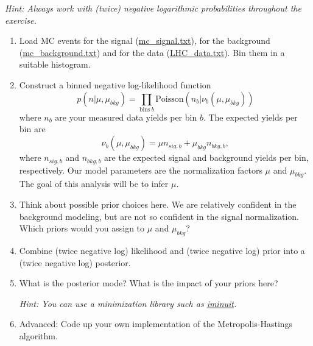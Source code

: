 \documentclass{article}
\begin{document}
\textit{Hint: Always work with (twice) negative logarithmic probabilities throughout the exercise.}
\begin{enumerate}
    \item Load MC events for the signal (\href{https://github.com/lorenzennio/icsc-bayesian-inference/blob/main/mc_signal.txt}{mc\_signal.txt}), for the background (\href{https://github.com/lorenzennio/icsc-bayesian-inference/blob/main/mc_background.txt}{mc\_background.txt}) and for the data (\href{https://github.com/lorenzennio/icsc-bayesian-inference/blob/main/LHC_data.txt}{LHC\_data.txt}). Bin them in a suitable histogram.

    \item Construct a binned negative log-likelihood function
    $$p(n|\mu, \mu_{bkg}) = \prod_{\mathrm{bins}~b} \mathrm{Poisson}(n_b|\nu_b(\mu, \mu_{bkg}))$$
    where $n_b$ are your measured data yields per bin $b$. The expected yields per bin are
    $$\nu_b(\mu, \mu_{bkg}) = \mu n_{sig,b} + \mu_{bkg} n_{bkg, b},$$
    where $n_{sig,b}$ and $n_{bkg,b}$ are the expected signal and background yields per bin, respectively. Our model parameters are the normalization factors $\mu$ and $\mu_{bkg}$. The goal of this analysis will be to infer $\mu$.

    \item Think about possible prior choices here. We are relatively confident in the background modeling, but are not so confident in the signal normalization. Which priors would you assign to $\mu$ and $\mu_{bkg}$?

    \item Combine (twice negative log) likelihood and (twice negative log) prior into a (twice negative log) posterior.

    \item What is the posterior mode? What is the impact of your priors here?
    
    \textit{Hint: You can use a minimization library such as \href{https://scikit-hep.org/iminuit/}{iminuit}.}


    \item {Advanced: Code up your own implementation of the Metropolis-Hastings algorithm.}


\end{enumerate}
\end{document}
